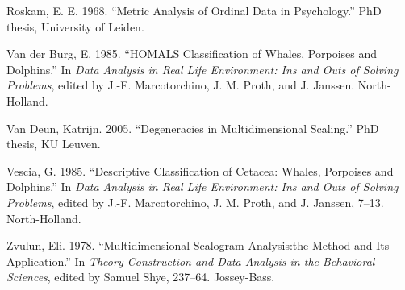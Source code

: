 \documentclass[
  12pt,
]{article}
\newlength{\cslhangindent}
\newenvironment{CSLReferences}[2] %
 {\begin{list}{}{%
  \setlength{\itemindent}{0pt}
  \setlength{\leftmargin}{0pt}
  \setlength{\parsep}{0pt}
  \ifodd #1
   \setlength{\leftmargin}{\cslhangindent}
   \setlength{\itemindent}{-1\cslhangindent}
  \fi
  \setlength{\itemsep}{#2\baselineskip}}}
 {\end{list}}
\begin{document}
\begin{CSLReferences}{1}{0}
Roskam, E. E. 1968. {``{Metric Analysis of Ordinal Data in Psychology}.''} PhD thesis, University of Leiden.

Van der Burg, E. 1985. {``HOMALS Classification of Whales, Porpoises and Dolphins.''} In \emph{Data Analysis in Real Life Environment: Ins and Outs of Solving Problems}, edited by J.-F. Marcotorchino, J. M. Proth, and J. Janssen. North-Holland.

Van Deun, Katrijn. 2005. {``Degeneracies in Multidimensional Scaling.''} PhD thesis, KU Leuven.

Vescia, G. 1985. {``Descriptive Classification of Cetacea: Whales, Porpoises and Dolphins.''} In \emph{Data Analysis in Real Life Environment: Ins and Outs of Solving Problems}, edited by J.-F. Marcotorchino, J. M. Proth, and J. Janssen, 7--13. North-Holland.

Zvulun, Eli. 1978. {``Multidimensional Scalogram Analysis:the Method and Its Application.''} In \emph{Theory Construction and Data Analysis in the Behavioral Sciences}, edited by Samuel Shye, 237--64. Jossey-Bass.

\end{CSLReferences}
\end{document}
